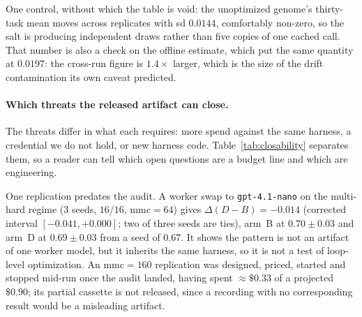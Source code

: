 \documentclass[11pt]{article}
\newcommand{\dd}{\ensuremath{\Delta}}
\begin{document}
One control, without which the table is void: the unoptimized genome's thirty-task mean moves
across replicates with sd $0.0144$, comfortably non-zero, so the salt is producing independent
draws rather than five copies of one cached call. That number is also a check on the offline
estimate, which put the same quantity at $0.0197$: the cross-run figure is $1.4\times$ larger,
which is the size of the drift contamination its own caveat predicted.


\paragraph{Which threats the released artifact can close.} The threats differ in what each
requires: more spend against the same harness, a credential we do not hold, or new harness
code. Table~\ref{tab:closability} separates them, so a reader can tell which open questions
are a budget line and which are engineering.

One replication predates the audit. A worker swap to \texttt{gpt-4.1-nano} on the multi-hard
regime ($3$ seeds, $16$/$16$, $\mathrm{mmc}=64$) gives $\dd(D-B) = -0.014$ (corrected interval
$[-0.041,+0.000]$; two of three seeds are ties), arm~B at $0.70 \pm 0.03$ and arm~D at
$0.69 \pm 0.03$ from a seed of $0.67$. It shows the pattern is not an artifact of one worker
model, but it inherits the same harness, so it is not a test of loop-level optimization. An
$\mathrm{mmc}{=}160$ replication was designed, priced, started and stopped mid-run once the
audit landed, having spent $\approx\!\$0.33$ of a projected $\$0.90$; its partial cassette is
not released, since a recording with no corresponding result would be a misleading artifact.
\end{document}
